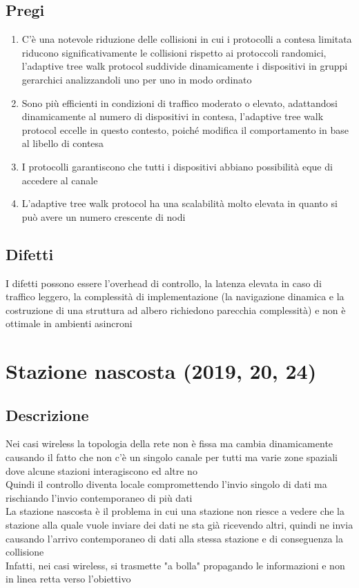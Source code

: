 \documentclass[10pt,oneside,a4paper]{article}
\begin{document}
\subsection{Pregi}
\begin{enumerate}
\item C'è una notevole riduzione delle collisioni in cui i protocolli a contesa limitata riducono significativamente le collisioni rispetto ai protoccoli randomici, l'adaptive tree walk protocol suddivide dinamicamente i dispositivi in gruppi gerarchici analizzandoli uno per uno in modo ordinato
\item Sono più efficienti in condizioni di traffico moderato o elevato, adattandosi dinamicamente al numero di dispositivi in contesa, l'adaptive tree walk protocol eccelle in questo contesto, poiché modifica il comportamento in base al libello di contesa
\item I protocolli garantiscono che tutti i dispositivi abbiano possibilità eque di accedere al canale
\item L'adaptive tree walk protocol ha una scalabilità molto elevata in quanto si può avere un numero crescente di nodi
\end{enumerate}
\subsection{Difetti}
I difetti possono essere l'overhead di controllo, la latenza elevata in caso di traffico leggero, la complessità di implementazione (la navigazione dinamica e la costruzione di una struttura ad albero richiedono parecchia complessità) e non è ottimale in ambienti asincroni
\section{Stazione nascosta (2019, 20, 24)}
\subsection{Descrizione}
Nei casi wireless la topologia della rete non è fissa ma cambia dinamicamente causando il fatto che non c'è un singolo canale per tutti ma varie zone spaziali dove alcune stazioni interagiscono ed altre no\\
Quindi il controllo diventa locale compromettendo l'invio singolo di dati ma rischiando l'invio contemporaneo di più dati\\
La stazione nascosta è il problema in cui una stazione non riesce a vedere che la stazione alla quale vuole inviare dei dati ne sta già ricevendo altri, quindi ne invia causando l'arrivo contemporaneo di dati alla stessa stazione e di conseguenza la collisione\\
Infatti, nei casi wireless, si trasmette "a bolla" propagando le informazioni e non in linea retta verso l'obiettivo
\end{document}
